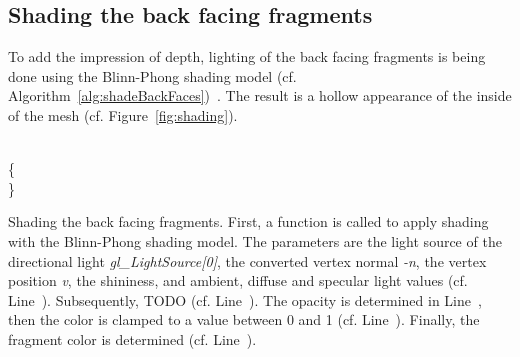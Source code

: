 \subsection{Shading the back facing fragments}
To add the impression of depth, lighting of the back facing fragments is being done using the Blinn-Phong shading model (cf. Algorithm~\ref{alg:shadeBackFaces})~\cite{book:computerGraphicsHearn}. The result is a hollow appearance of the inside of the mesh (cf. Figure~\ref{fig:shading}).
\LinesNumbered
\begin{algorithm}
\\
\{\\
\Indp{}\;
	\;\label{ln:normVN}
	\BlankLine
	\;\label{ln:color}
\Indm\}
\BlankLine
\caption{Shading the back facing fragments. First, a function is called to apply shading with the Blinn-Phong shading model. The parameters are the light source of the directional light \emph{gl\_LightSource[0]}, the converted vertex normal \emph{-n}, the vertex position \emph{v}, the shininess, and ambient, diffuse and specular light values (cf. Line~\NlSty{\ref{ln:bphong}}). Subsequently, TODO (cf. Line~\NlSty{\ref{ln:light}}). The opacity is determined in Line~\NlSty{\ref{ln:opacity}}, then the color is clamped to a value between 0 and 1 (cf. Line~\NlSty{\ref{ln:clamp}}). Finally, the fragment color is determined (cf. Line~\NlSty{\ref{ln:color}}).}
\label{alg:shadeBackFaces}
\end{algorithm}
\LinesNotNumbered

